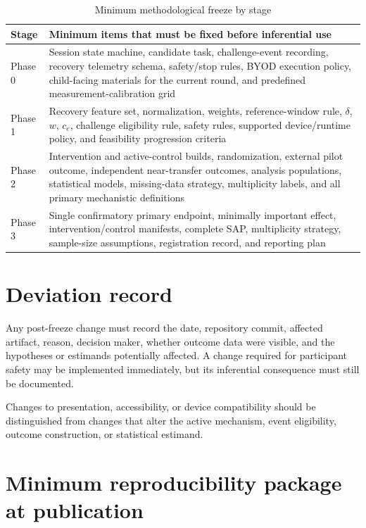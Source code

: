 \documentclass[man]{apa7}
\begin{document}
\begin{table}[htbp]
\centering
\small
\caption{Minimum methodological freeze by stage}
\begin{tabular}{p{2.3cm}p{9.8cm}}
\toprule
Stage & Minimum items that must be fixed before inferential use \\
\midrule
Phase 0 & Session state machine, candidate task, challenge-event recording, recovery telemetry schema, safety/stop rules, BYOD execution policy, child-facing materials for the current round, and predefined measurement-calibration grid \\
Phase 1 & Recovery feature set, normalization, weights, reference-window rule, \(\delta\), \(w\), \(c_e\), challenge eligibility rule, safety rules, supported device/runtime policy, and feasibility progression criteria \\
Phase 2 & Intervention and active-control builds, randomization, external pilot outcome, independent near-transfer outcomes, analysis populations, statistical models, missing-data strategy, multiplicity labels, and all primary mechanistic definitions \\
Phase 3 & Single confirmatory primary endpoint, minimally important effect, intervention/control manifests, complete SAP, multiplicity strategy, sample-size assumptions, registration record, and reporting plan \\
\bottomrule
\end{tabular}
\end{table}

\section{Deviation record}

Any post-freeze change must record the date, repository commit, affected artifact, reason, decision maker, whether outcome data were visible, and the hypotheses or estimands potentially affected. A change required for participant safety may be implemented immediately, but its inferential consequence must still be documented.

Changes to presentation, accessibility, or device compatibility should be distinguished from changes that alter the active mechanism, event eligibility, outcome construction, or statistical estimand.

\section{Minimum reproducibility package at publication}
\end{document}
